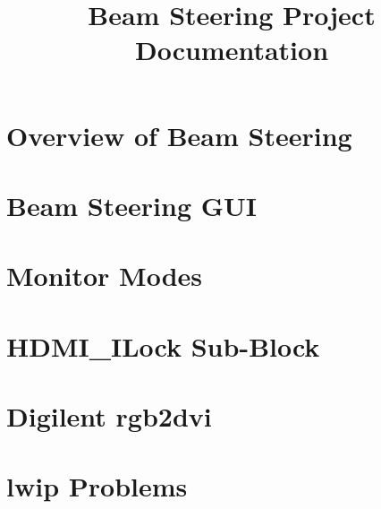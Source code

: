 \documentclass[10pt,a4paper]{article}
\title{Beam Steering Project Documentation}
\begin{document}
	\maketitle
	\tableofcontents

	\newpage
	
	
	\section{Overview of Beam Steering}
	\label{sec:overview}
			

	\section{Beam Steering GUI}
	\label{sec:bs_gui}
		

	\section{Monitor Modes}
	\label{sec:monitor_modes}
		
	
	\section{HDMI\_ILock Sub-Block}
	\label{sec:hdmi_ilock}
		
	
	\section{Digilent rgb2dvi}
	\label{sec:rgb2dvi}
		
		
	\section{lwip Problems}
	\label{sec:lwip_problems}
		
		
%		

	
%		
\end{document}
